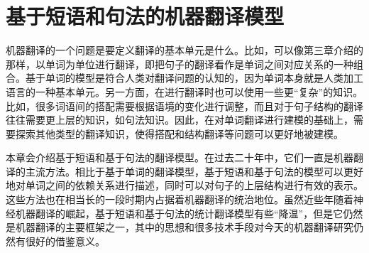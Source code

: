 
%

\renewcommand\figurename{图}%
\renewcommand\tablename{表}%


\chapter{基于短语和句法的机器翻译模型}

\parinterval 机器翻译的一个问题是要定义翻译的基本单元是什么。比如，可以像第三章介绍的那样，以单词为单位进行翻译，即把句子的翻译看作是单词之间对应关系的一种组合。基于单词的模型是符合人类对翻译问题的认知的，因为单词本身就是人类加工语言的一种基本单元。另一方面，在进行翻译时也可以使用一些更``复杂''的知识。比如，很多词语间的搭配需要根据语境的变化进行调整，而且对于句子结构的翻译往往需要更上层的知识，如句法知识。因此，在对单词翻译进行建模的基础上，需要探索其他类型的翻译知识，使得搭配和结构翻译等问题可以更好地被建模。

\parinterval 本章会介绍基于短语和基于句法的翻译模型。在过去二十年中，它们一直是机器翻译的主流方法。相比于基于单词的翻译模型，基于短语和基于句法的模型可以更好地对单词之间的依赖关系进行描述，同时可以对句子的上层结构进行有效的表示。这些方法也在相当长的一段时期内占据着机器翻译的统治地位。虽然近些年随着神经机器翻译的崛起，基于短语和基于句法的统计翻译模型有些``降温''，但是它仍然是机器翻译的主要框架之一，其中的思想和很多技术手段对今天的机器翻译研究仍然有很好的借鉴意义。


